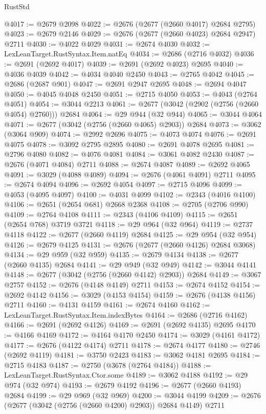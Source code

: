 \begin{lexlean}{RustStd}
\begin{coremodule}
@4017 := @2679 @2098
@4022 := @2676 (@2677 (@2660 @4017) @2684 @2795)
@4023 := @2679 @2146
@4029 := @2676 (@2677 (@2660 @4023) @2684 @2947) @2711
@4030 := @4022 @4029
@4031 := @2674 @4030
@4032 := LexLeanTarget.RustSyntax.Item.natEq
@4034 := @2686 (@2716 @4032)
@4036 := @2691 (@2692 @4017)
@4039 := @2691 (@2692 @4023) @2695
@4040 := @4036 @4039
@4042 := @4034 @4040 @2450
@4043 := @2765 @4042
@4045 := @2686 (@2687 @901)
@4047 := @2691 @2947 @2695
@4048 := @2694 @4047
@4050 := @4045 @4048 @2450
@4051 := @2715 @4050
@4053 := @4043 (@2764 @4051)
@4054 := @3044 @2213
@4061 := @2677 (@3042 (@2902 (@2756 (@2660 @4054) @2760))) @2684
@4064 := @29 @944 (@32 @944)
@4065 := @3044 @4064
@4071 := @2677 (@3042 (@2756 (@2660 @4065) @2903)) @2684
@4073 := @3062 (@3064 @909)
@4074 := @2992 @2696
@4075 := @4073 @4074
@4076 := @2691 @4075
@4078 := @3092 @2795 @2895
@4080 := @2691 @4078 @2695
@4081 := @2796 @4080
@4082 := @4076 @4081
@4084 := @3061 @4082 @2430
@4087 := @2676 (@4071 @4084) @2711
@4088 := @2674 @4087
@4089 := @2692 @4065
@4091 := @3029 (@4088 @4089)
@4094 := @2676 (@4061 @4091) @2711
@4095 := @2674 @4094
@4096 := @2692 @4054
@4097 := @2715 @4096
@4099 := @4053 (@4095 @4097)
@4100 := @4031 @4099
@4102 := @2343 (@4016 @4100)
@4106 := @2651 (@2654 @681) @2668 @2368
@4108 := @2705 (@2706 @990)
@4109 := @2764 @4108
@4111 := @2343 (@4106 @4109)
@4115 := @2651 (@2654 @768) @3719 @3721
@4118 := @29 @964 (@32 @964)
@4119 := @2737 @4118
@4122 := @2677 (@2660 @4119) @2684
@4125 := @29 @954 (@32 @954)
@4126 := @2679 @4125
@4131 := @2676 (@2677 (@2660 @4126) @2684 @3068)
@4134 := @29 @959 (@32 @959)
@4135 := @2679 @4134
@4138 := @2677 (@2660 @4135) @2684
@4141 := @29 @949 (@32 @949)
@4142 := @3044 @4141
@4148 := @2677 (@3042 (@2756 (@2660 @4142) @2903)) @2684
@4149 := @3067 @2757
@4152 := @2676 (@4148 @4149) @2711
@4153 := @2674 @4152
@4154 := @2692 @4142
@4156 := @3029 (@4153 @4154)
@4159 := @2676 (@4138 @4156) @2711
@4160 := @4131 @4159
@4161 := @2674 @4160
@4162 := LexLeanTarget.RustSyntax.Item.indexBytes
@4164 := @2686 (@2716 @4162)
@4166 := @2691 (@2692 @4126)
@4169 := @2691 (@2692 @4135) @2695
@4170 := @4166 @4169
@4172 := @4164 @4170 @2450
@4174 := @3029 (@4161 @4172)
@4177 := @2676 (@4122 @4174) @2711
@4178 := @2674 @4177
@4180 := @2746 (@2692 @4119)
@4181 := @3750 @2423
@4183 := @3062 @4181 @2695
@4184 := @2715 @4183
@4187 := @2750 (@3678 (@2764 @4184))
@4188 := LexLeanTarget.RustSyntax.Ctor.some
@4189 := @3062 @4188
@4192 := @29 @974 (@32 @974)
@4193 := @2679 @4192
@4196 := @2677 (@2660 @4193) @2684
@4199 := @29 @969 (@32 @969)
@4200 := @3044 @4199
@4209 := @2676 (@2677 (@3042 (@2756 (@2660 @4200) @2903)) @2684 @4149) @2711

\end{coremodule}
\end{lexlean}
